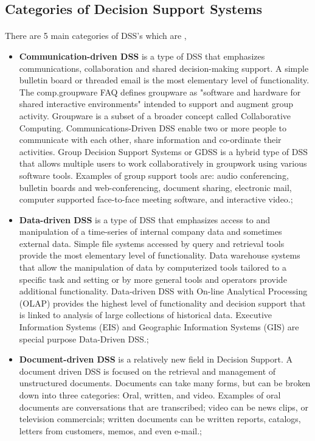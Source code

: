 \subsection{Categories of Decision Support Systems}

\paragraph{} There are 5 main categories of DSS's which are \cite{Power2003},

\begin {itemize}
\item \textbf{Communication-driven DSS} is a type of DSS that emphasizes communications, collaboration and shared decision-making support. A simple bulletin board or threaded email is the most elementary level of functionality. The comp.groupware FAQ defines groupware as "software and hardware for shared interactive environments" intended to support and augment group activity. Groupware is a subset of a broader concept called Collaborative Computing. Communications-Driven DSS enable two or more people to communicate with each other, share information and co-ordinate their activities. Group Decision Support Systems or GDSS is a hybrid type of DSS that allows multiple users to work collaboratively in groupwork using various software tools. Examples of group support tools are: audio conferencing, bulletin boards and web-conferencing, document sharing, electronic mail, computer supported face-to-face meeting software, and interactive video.; 
\item \textbf{Data-driven DSS} is a type of DSS that emphasizes access to and manipulation of a time-series of internal company data and sometimes external data. Simple file systems accessed by query and retrieval tools provide the most elementary level of functionality. Data warehouse systems that allow the manipulation of data by computerized tools tailored to a specific task and setting or by more general tools and operators provide additional functionality. Data-driven DSS with On-line Analytical Processing (OLAP) provides the highest level of functionality and decision support that is linked to analysis of large collections of historical data. Executive Information Systems (EIS) and Geographic Information Systems (GIS) are special purpose Data-Driven DSS.;
\item \textbf{Document-driven DSS} is a relatively new field in Decision Support. A document driven DSS is focused on the retrieval and management of unstructured documents. Documents can take many forms, but can be broken down into three categories: Oral, written, and video. Examples of oral documents are conversations that are transcribed; video can be news clips, or television commercials; written documents can be written reports, catalogs, letters from customers, memos, and even e-mail.;

\end{itemize}
